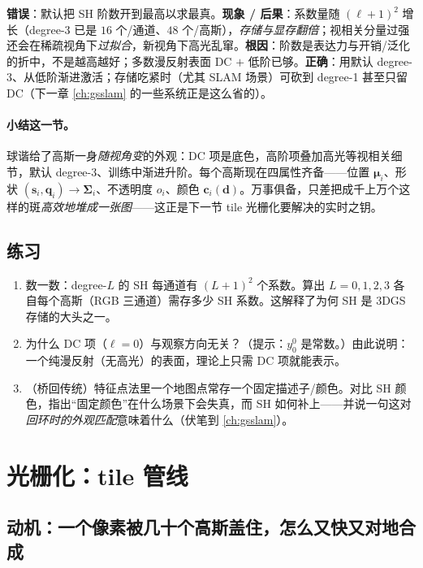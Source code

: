 \begin{pitfall}
\textbf{错误}：默认把 SH 阶数开到最高以求最真。\textbf{现象 / 后果}：系数量随 $(\ell+1)^2$ 增长（degree-3 已是 $16$ 个/通道、$48$ 个/高斯），\emph{存储与显存翻倍}；视相关分量过强还会在稀疏视角下\emph{过拟合}，新视角下高光乱窜。\textbf{根因}：阶数是表达力与开销/泛化的折中，不是越高越好；多数漫反射表面 DC $+$ 低阶已够。\textbf{正确}：用默认 degree-3、从低阶渐进激活；存储吃紧时（尤其 SLAM 场景）可砍到 degree-1 甚至只留 DC（下一章 \cref{ch:gsslam} 的一些系统正是这么省的）。
\end{pitfall}

\paragraph{小结这一节。}
球谐给了高斯一身\emph{随视角变}的外观：DC 项是底色，高阶项叠加高光等视相关细节，默认 degree-3、训练中渐进升阶。每个高斯现在四属性齐备——位置 $\boldsymbol\mu_i$、形状 $(\mathbf s_i,\mathbf q_i)\!\to\!\boldsymbol\Sigma_i$、不透明度 $o_i$、颜色 $\mathbf c_i(\mathbf d)$。万事俱备，只差把成千上万个这样的斑\emph{高效地堆成一张图}——这正是下一节 tile 光栅化要解决的实时之钥。

\subsection*{练习}
\begin{enumerate}
  \item 数一数：degree-$L$ 的 SH 每通道有 $(L+1)^2$ 个系数。算出 $L=0,1,2,3$ 各自每个高斯（RGB 三通道）需存多少 SH 系数。这解释了为何 SH 是 3DGS 存储的大头之一。
  \item 为什么 DC 项（$\ell=0$）与观察方向无关？（提示：$y_0^0$ 是常数。）由此说明：一个纯漫反射（无高光）的表面，理论上只需 DC 项就能表示。
  \item （桥回传统）特征点法里一个地图点常存一个固定描述子/颜色。对比 SH 颜色，指出“固定颜色”在什么场景下会失真，而 SH 如何补上——并说一句这对\emph{回环时的外观匹配}意味着什么（伏笔到 \cref{ch:gsslam}）。
\end{enumerate}

\section{光栅化：tile 管线}
\label{sec:3dgs-raster}

\subsection{动机：一个像素被几十个高斯盖住，怎么又快又对地合成}

